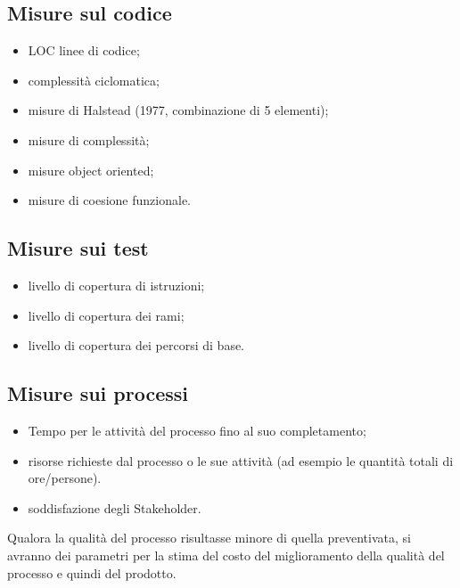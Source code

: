 \subsection{Misure sul codice}

\begin{itemize}
  
\item LOC linee di codice;
\item complessit\`a ciclomatica;
\item misure di Halstead (1977, combinazione di 5 elementi);
\item misure di complessit\`a;
\item misure object oriented;
\item misure di coesione funzionale.

\end{itemize}


\subsection{Misure sui test}

\begin{itemize}
  
\item livello di copertura di istruzioni;
\item livello di copertura dei rami;
\item livello di copertura dei percorsi di base.
\end{itemize}



  
\subsection{Misure sui processi} 

\begin{itemize} 
\item Tempo per le attivit\`a del processo fino al suo completamento;
\item risorse richieste dal processo o le sue attivit\`a (ad esempio le quantit\`a
totali di ore/persone).
\item soddisfazione degli Stakeholder.  
\end{itemize}

Qualora la qualit\`a del processo risultasse minore di quella preventivata,
si avranno dei parametri per la stima del costo del miglioramento della qualit\`a
del processo e quindi del prodotto.



